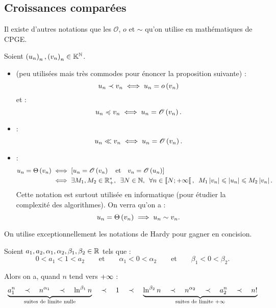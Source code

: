 \subsection{Croissances comparées}

\begin{rem}[Culturelle]
Il existe d'autres notations que les  \(\mathscr{O}\), \(o\) et \(\sim\) qu'on utilise en mathématiques de CPGE.

Soient \(\left(u_n\right)_n,\left(v_n\right)_n\in\mathbb{K}^{\mathbb{N}}\).

\begin{itemize}
    \item {} (peu utilisées mais très commodes pour énoncer la proposition suivante) : \[u_n\prec v_n\iff u_n=o\left(v_n\right)\] et : \[u_n\preccurlyeq v_n\iff u_n=\mathscr{O}\left(v_n\right).\]
    \item {} : \[u_n\ll v_n\iff u_n=\mathscr{O}\left(v_n\right).\]
    \item {} : \[\begin{aligned}
        u_n=\Theta\paren{v_n}&\ssi\croch{u_n=\O{v_n}\quad\text{et}\quad v_n=\O{u_n}} \\
        &\ssi\quantifs{\exists M_1,M_2\in\Rps;\exists N\in\N;\forall n\in\interventierie{N}{\pinf}}M_1\abs{v_n}\leq\abs{u_n}\leq M_2\abs{v_n}.
    \end{aligned}\] Cette notation est surtout utilisée en informatique (pour étudier la complexité des algorithmes). On verra qu'on a : \[u_n=\Theta\left(v_n\right)\implies u_n\sim v_n.\]
\end{itemize}
\end{rem}

\begin{prop}
On utilise exceptionnellement les notations de Hardy pour gagner en concision.

Soient \(a_1,a_2,\alpha_1,\alpha_2,\beta_1,\beta_2\in\mathbb{R}\) tels que : \[0<a_1<1<a_2\qquad\text{et}\qquad\alpha_1<0<\alpha_2\qquad\text{et}\qquad\beta_1<0<\beta_2.\]

Alors on a, quand \(n\) tend vers \(+\infty\) : \[\underbrace{a_1^n\quad\prec\quad n^{\alpha_1}\quad\prec\quad\ln^{\beta_1}n}_{\text{suites de limite nulle}}\quad\prec\quad1\quad\prec\quad\underbrace{\ln^{\beta_2}n\quad\prec\quad n^{\alpha_2}\quad\prec\quad a_2^n\quad\prec\quad n!}_{\text{suites de limite }+\infty}\]
\end{prop}

